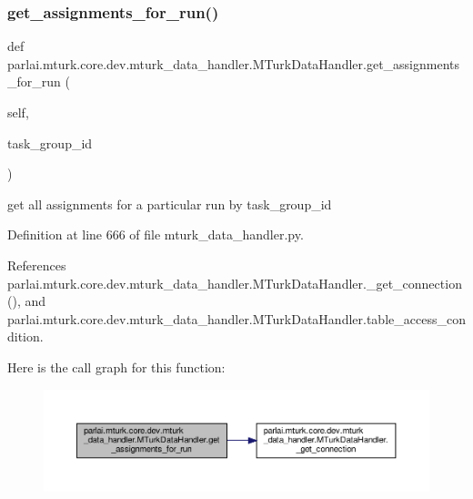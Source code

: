 \subsubsection{\texorpdfstring{get\+\_\+assignments\+\_\+for\+\_\+run()}{get\_assignments\_for\_run()}}
{\footnotesize\ttfamily def parlai.\+mturk.\+core.\+dev.\+mturk\+\_\+data\+\_\+handler.\+M\+Turk\+Data\+Handler.\+get\+\_\+assignments\+\_\+for\+\_\+run (\begin{DoxyParamCaption}\item[{}]{self,  }\item[{}]{task\+\_\+group\+\_\+id }\end{DoxyParamCaption})}

\begin{DoxyVerb}get all assignments for a particular run by task_group_id\end{DoxyVerb}
 

Definition at line 666 of file mturk\+\_\+data\+\_\+handler.\+py.



References parlai.\+mturk.\+core.\+dev.\+mturk\+\_\+data\+\_\+handler.\+M\+Turk\+Data\+Handler.\+\_\+get\+\_\+connection(), and parlai.\+mturk.\+core.\+dev.\+mturk\+\_\+data\+\_\+handler.\+M\+Turk\+Data\+Handler.\+table\+\_\+access\+\_\+condition.

Here is the call graph for this function\+:
\nopagebreak
\begin{figure}[H]
\begin{center}
\leavevmode
\includegraphics[width=350pt]{classparlai_1_1mturk_1_1core_1_1dev_1_1mturk__data__handler_1_1MTurkDataHandler_aa3f132c04075d005d6639b938414ac0f_cgraph}
\end{center}
\end{figure}
\mbox{\label{classparlai_1_1mturk_1_1core_1_1dev_1_1mturk__data__handler_1_1MTurkDataHandler_af46969088769ed561fd4206e729aecf9}} 
